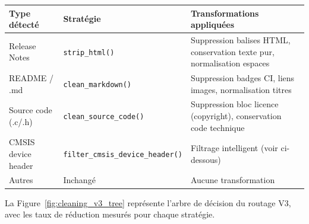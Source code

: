 \documentclass[12pt,a4paper]{report}
\begin{document}
\begin{longtable}{p{3.5cm}p{3.5cm}p{6cm}}
\toprule
\textbf{Type détecté} & \textbf{Stratégie} & \textbf{Transformations appliquées} \\
\midrule
Release Notes & \texttt{strip\_html()} & Suppression balises HTML, conservation texte pur, normalisation espaces \\
README / .md & \texttt{clean\_markdown()} & Suppression badges CI, liens images, normalisation titres \\
Source code (.c/.h) & \texttt{clean\_source\_code()} & Suppression bloc licence (copyright), conservation code technique \\
CMSIS device header & \texttt{filter\_cmsis\_device\_header()} & Filtrage intelligent (voir ci-dessous) \\
Autres & Inchangé & Aucune transformation \\
\bottomrule
\end{longtable}

La Figure~\ref{fig:cleaning_v3_tree} représente l'arbre de décision du routage V3, avec les taux de réduction mesurés pour chaque stratégie.
\end{document}
